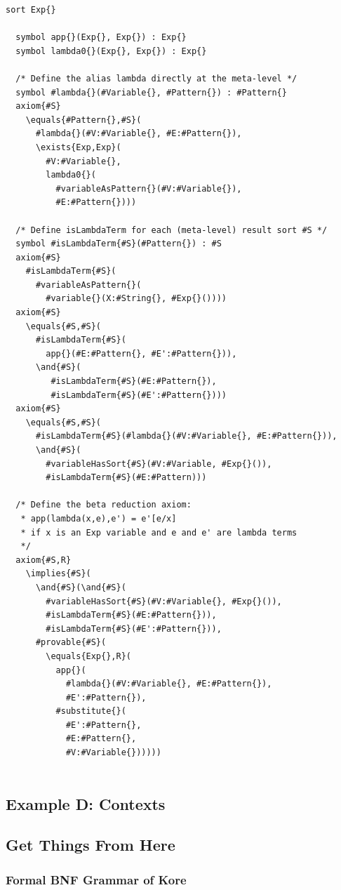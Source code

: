 \documentclass[UTF8,11pt]{article}
\theoremstyle{plain}
\theoremstyle{definition}
\theoremstyle{remark}
\begin{document}
\begin{lstlisting}[language=kore]
  sort Exp{}
  
  symbol app{}(Exp{}, Exp{}) : Exp{}
  symbol lambda0{}(Exp{}, Exp{}) : Exp{}
  
  /* Define the alias lambda directly at the meta-level */
  symbol #lambda{}(#Variable{}, #Pattern{}) : #Pattern{}
  axiom{#S}
    \equals{#Pattern{},#S}(
      #lambda{}(#V:#Variable{}, #E:#Pattern{}),
      \exists{Exp,Exp}(
        #V:#Variable{},
        lambda0{}(
          #variableAsPattern{}(#V:#Variable{}), 
          #E:#Pattern{})))
   
  /* Define isLambdaTerm for each (meta-level) result sort #S */
  symbol #isLambdaTerm{#S}(#Pattern{}) : #S
  axiom{#S}
    #isLambdaTerm{#S}(
      #variableAsPattern{}(
        #variable{}(X:#String{}, #Exp{}())))
  axiom{#S}
    \equals{#S,#S}(
      #isLambdaTerm{#S}(
        app{}(#E:#Pattern{}, #E':#Pattern{})),
      \and{#S}(
         #isLambdaTerm{#S}(#E:#Pattern{}),
         #isLambdaTerm{#S}(#E':#Pattern{})))
  axiom{#S}
    \equals{#S,#S}(
      #isLambdaTerm{#S}(#lambda{}(#V:#Variable{}, #E:#Pattern{})),
      \and{#S}(
        #variableHasSort{#S}(#V:#Variable, #Exp{}()),
        #isLambdaTerm{#S}(#E:#Pattern)))
        
  /* Define the beta reduction axiom:
   * app(lambda(x,e),e') = e'[e/x]
   * if x is an Exp variable and e and e' are lambda terms
   */
  axiom{#S,R}
    \implies{#S}(
      \and{#S}(\and{#S}(
        #variableHasSort{#S}(#V:#Variable{}, #Exp{}()),
        #isLambdaTerm{#S}(#E:#Pattern{})),
        #isLambdaTerm{#S}(#E':#Pattern{})),
      #provable{#S}(
        \equals{Exp{},R}(
          app{}(
            #lambda{}(#V:#Variable{}, #E:#Pattern{}),
            #E':#Pattern{}),
          #substitute{}(
            #E':#Pattern{},
            #E:#Pattern{},
            #V:#Variable{})))))
        
\end{lstlisting}

\subsection{Example D: Contexts}

\subsection{Get Things From Here}

\subsubsection{Formal BNF Grammar of Kore}
\end{document}
